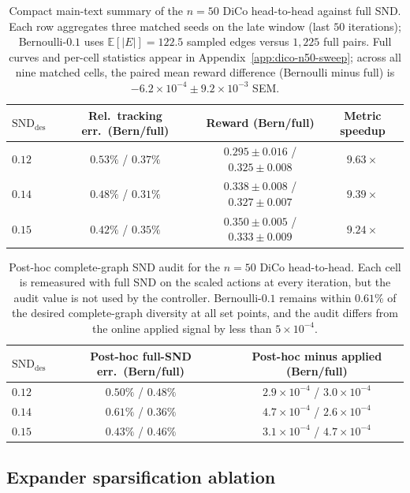 \documentclass{article}
\theoremstyle{plain}
\theoremstyle{definition}
\theoremstyle{remark}
\newcommand{\E}{\mathbb{E}}
\newcommand{\SND}{\ensuremath{\mathrm{SND}}}
\begin{document}
\begin{table}[t]
\centering
\small
\begin{tabular}{lccc}
\toprule
$\SND_{\mathrm{des}}$ & Rel.\ tracking err.\ (Bern/full) & Reward (Bern/full) & Metric speedup \\
\midrule
$0.12$ & $0.53\%$ / $0.37\%$ & $0.295{\pm}0.016$ / $0.325{\pm}0.008$ & $9.63\times$ \\
$0.14$ & $0.48\%$ / $0.31\%$ & $0.338{\pm}0.008$ / $0.327{\pm}0.007$ & $9.39\times$ \\
$0.15$ & $0.42\%$ / $0.35\%$ & $0.350{\pm}0.005$ / $0.333{\pm}0.009$ & $9.24\times$ \\
\bottomrule
\end{tabular}
\caption{Compact main-text summary of the $n{=}50$ DiCo head-to-head
against full SND. Each row aggregates three matched seeds on the late
window (last $50$ iterations); Bernoulli-$0.1$ uses
$\E[|E|]=122.5$ sampled edges versus $1{,}225$ full pairs. Full curves
and per-cell statistics appear in Appendix~\ref{app:dico-n50-sweep};
across all nine matched cells, the paired mean reward difference
(Bernoulli minus full) is $-6.2{\times}10^{-4}\pm9.2{\times}10^{-3}$
SEM.}
\label{tab:dico-n50-main}
\end{table}

\begin{table}[t]
\centering
\small
\begin{tabular}{lcc}
\toprule
$\SND_{\mathrm{des}}$ & Post-hoc full-SND err.\ (Bern/full) &
Post-hoc minus applied (Bern/full) \\
\midrule
$0.12$ & $0.50\%$ / $0.48\%$ &
$2.9{\times}10^{-4}$ / $3.0{\times}10^{-4}$ \\
$0.14$ & $0.61\%$ / $0.36\%$ &
$4.7{\times}10^{-4}$ / $2.6{\times}10^{-4}$ \\
$0.15$ & $0.43\%$ / $0.46\%$ &
$3.1{\times}10^{-4}$ / $4.7{\times}10^{-4}$ \\
\bottomrule
\end{tabular}
\caption{Post-hoc complete-graph SND audit for the $n{=}50$ DiCo
head-to-head. Each cell is remeasured with full SND on the scaled
actions at every iteration, but the audit value is not used by the
controller. Bernoulli-$0.1$ remains within $0.61\%$ of the desired
complete-graph diversity at all set points, and the audit differs from
the online applied signal by less than $5{\times}10^{-4}$.}
\label{tab:dico-n50-posthoc-main}
\end{table}

\subsection{Expander sparsification ablation}
\label{sec:experiments:expander}
\end{document}
